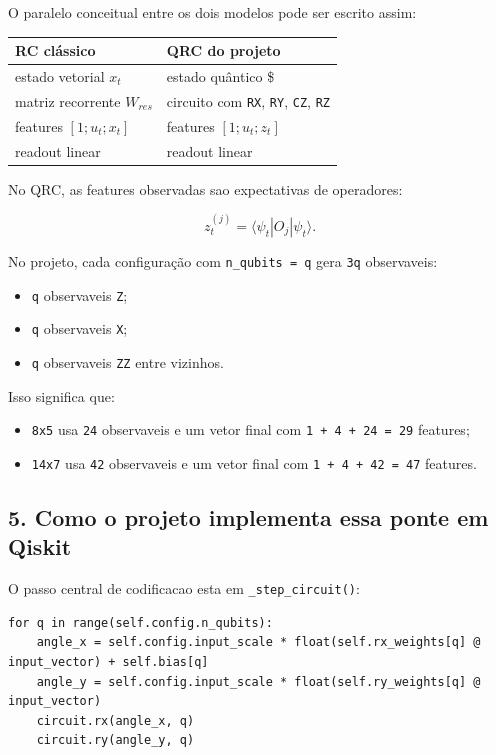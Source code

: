 \documentclass[12pt]{article}
\providecommand{\tightlist}{%
          \setlength{\itemsep}{0pt}\setlength{\parskip}{0pt}}
\begin{document}
O paralelo conceitual entre os dois modelos pode ser escrito assim:

\begin{longtable}[]{@{}ll@{}}
\toprule\noalign{}
RC clássico & QRC do projeto \\
\midrule\noalign{}
\endhead
\bottomrule\noalign{}
\endlastfoot
estado vetorial \(x_t\) & estado quântico \$ \\
matriz recorrente \(W_{res}\) & circuito com \texttt{RX}, \texttt{RY}, \texttt{CZ}, \texttt{RZ} \\
features \([1; u_t; x_t]\) & features \([1; u_t; z_t]\) \\
readout linear & readout linear \\
\end{longtable}

No QRC, as features observadas sao expectativas de operadores:

\[
z_t^{(j)} = \langle \psi_t | O_j | \psi_t \rangle.
\]

No projeto, cada configuração com \texttt{n\_qubits\ =\ q} gera \texttt{3q} observaveis:

\begin{itemize}
\tightlist
\item
  \texttt{q} observaveis \texttt{Z};
\item
  \texttt{q} observaveis \texttt{X};
\item
  \texttt{q} observaveis \texttt{ZZ} entre vizinhos.
\end{itemize}

Isso significa que:

\begin{itemize}
\tightlist
\item
  \texttt{8x5} usa \texttt{24} observaveis e um vetor final com \texttt{1\ +\ 4\ +\ 24\ =\ 29} features;
\item
  \texttt{14x7} usa \texttt{42} observaveis e um vetor final com \texttt{1\ +\ 4\ +\ 42\ =\ 47} features.
\end{itemize}

\subsection{5. Como o projeto implementa essa ponte em Qiskit}\label{5-como-o-projeto-implementa-essa-ponte-em-qiskit}

O passo central de codificacao esta em \texttt{\_step\_circuit()}:

\begin{verbatim}
for q in range(self.config.n_qubits):
    angle_x = self.config.input_scale * float(self.rx_weights[q] @ input_vector) + self.bias[q]
    angle_y = self.config.input_scale * float(self.ry_weights[q] @ input_vector)
    circuit.rx(angle_x, q)
    circuit.ry(angle_y, q)
\end{verbatim}
\end{document}
